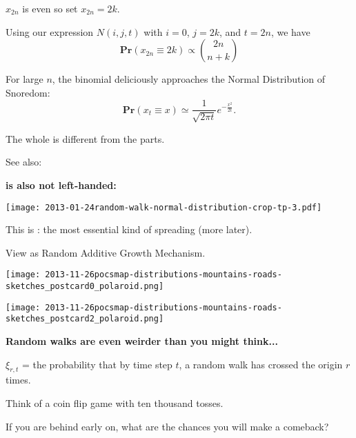       $x_{2n}$ is even so set $x_{2n} = 2k$.
    
      Using our expression $N(i,j,t)$ with
      $i=0$, $j=2k$, and $t=2n$, we have
      $$
      \mathbf{Pr}(x_{2n} \equiv 2k) 
      \propto 
      \binom{2n}{n+k}
      $$
    
      For large $n$, the binomial
      deliciously approaches the Normal Distribution of Snoredom:
      $$
      \mathbf{Pr}(x_{t} \equiv x) 
      \simeq
      \frac{1}{\sqrt{2\pi t}}
      e^{-\frac{x^2}{2t}}.
      $$
     
      The whole is different from the parts. \hfill {}
     
      See also: 
    
  



  \textbf{ is also not left-handed:}

  
    \texttt{[image: 2013-01-24random-walk-normal-distribution-crop-tp-3.pdf]}
    
     
      This is : 
      the most essential kind of spreading (more later).
     
    View as Random Additive Growth Mechanism.
  
  


  \texttt{[image: 2013-11-26pocsmap-distributions-mountains-roads-sketches\_postcard0\_polaroid.png]}

  \texttt{[image: 2013-11-26pocsmap-distributions-mountains-roads-sketches\_postcard2\_polaroid.png]}



  \textbf{Random walks are even weirder than you might think...}
    
    
      $\xi_{r,t}$ = the probability that by time step $t$,
      a random walk has crossed the origin $r$ times.
    
      Think of a coin flip game with ten thousand tosses.
    
      If you are behind early on, what are the chances you
      will make a comeback?
    
